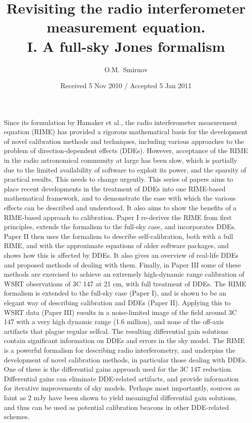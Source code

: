 \documentclass{aa}
\begin{document}
\title{Revisiting the radio interferometer measurement equation.\\I. A full-sky Jones formalism}

\author{O.M.\ Smirnov}


\date{Received 5 Nov 2010 / Accepted 5 Jan 2011}


\abstract%
{Since its formulation by Hamaker et al., the radio interferometer measurement equation (RIME) 
has provided a rigorous mathematical basis for the development of novel calibration methods and 
techniques, including various approaches to the problem of direction-dependent effects (DDEs). 
However, acceptance of the RIME in the radio astronomical community at large has been slow, which is
partially due to the limited availability of software to exploit its power, and the sparsity of 
practical results. This needs to change urgently.}
{This series of papers aims to place recent developments in the treatment of DDEs into one 
RIME-based mathematical  framework, and to demonstrate the ease with which the various effects 
can be described and understood. It also aims to show the benefits of a RIME-based approach to calibration.
}
{Paper I re-derives the RIME from first principles, extends the formalism to
the full-sky case, and incorporates DDEs. Paper II then uses the formalism to describe self-calibration, both with 
a full RIME, and with the approximate equations of older software packages, and shows how this is affected 
by DDEs. It also gives an overview of real-life DDEs and proposed methods of dealing with them. Finally, in Paper III 
some of these methods are exercised to achieve an extremely high-dynamic range calibration of WSRT observations of 3C 147 at 21 cm, 
with full treatment of DDEs.
}%
{The RIME formalism is extended to the full-sky case (Paper I), and is shown to be an elegant way of describing calibration and DDEs (Paper II).
Applying this to WSRT data (Paper III) results in a noise-limited image of the field around 3C 147 with a very high dynamic range (1.6 million), and 
none of the off-axis artifacts that plague regular selfcal. The resulting differential gain solutions contain significant 
information on DDEs and errors in the sky model. 
}%
{The RIME is a powerful formalism for describing radio interferometry, and underpins the development of novel calibration methods,
in particular those dealing with DDEs. One of these is the differential gains approach used for the 3C 147 reduction. Differential 
gains can eliminate DDE-related artifacts, and provide information for iterative improvements of sky models. 
Perhaps most importantly, sources as faint as 2 mJy have been shown to yield meaningful differential gain solutions, 
and thus can be used as potential calibration beacons in other DDE-related schemes.}
\end{document}
